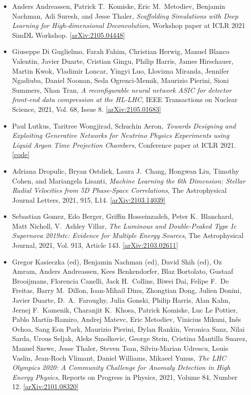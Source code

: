 \begin{itemize}
\item Anders Andreassen, Patrick T.\  Komiske, Eric M.\  Metodiev, Benjamin Nachman, Adi Suresh, and Jesse Thaler, \textit{Scaffolding Simulations with Deep Learning for High-dimensional Deconvolution}, Workshop paper at ICLR 2021 SimDL Workshop. \href{https://arxiv.org/abs/2105.04448}{[arXiv:2105.04448]} 
\item Giuseppe Di Guglielmo, Farah Fahim, Christian Herwig, Manuel Blanco Valentin, Javier Duarte, Cristian Gingu, Philip Harris, James Hirschauer, Martin Kwok, Vladimir Loncar, Yingyi Luo, Llovizna Miranda, Jennifer Ngadiuba, Daniel Noonan, Seda Ogrenci-Memik, Maurizio Pierini, Sioni Summers, Nhan Tran, \textit{A reconfigurable neural network ASIC for detector front-end data compression at the HL-LHC}, IEEE Transactions on Nuclear Science, 2021, Vol. 68, Issue 8. \href{https://arxiv.org/abs/2105.01683}{[arXiv:2105.01683]} 
\item Paul Lutkus, Taritree Wongjirad, Schuchin Aeron, \textit{Towards Designing and Exploiting Generative Networks for Neutrino Physics Experiments using Liquid Argon Time Projection Chambers}, Conference paper at ICLR 2021.  \href{https://github.com/NuTufts/LArTPC-VQVAE}{[code]} 
\item Adriana Dropulic, Bryan Ostdiek, Laura J.\  Chang, Hongwan Liu, Timothy Cohen, and Mariangela Lisanti, \textit{Machine Learning the 6th Dimension: Stellar Radial Velocities from 5D Phase-Space Correlations}, The Astrophysical Journal Letters, 2021, 915, L14. \href{https://arxiv.org/abs/2103.14039}{[arXiv:2103.14039]} 
\item Sebastian Gomez, Edo Berger, Griffin Hosseinzadeh, Peter K.\  Blanchard, Matt Nicholl, V.\  Ashley Villar, \textit{The Luminous and Double-Peaked Type Ic Supernova 2019stc: Evidence for Multiple Energy Sources}, The Astrophysical Journal, 2021, Vol. 913, Article 143. \href{https://arxiv.org/abs/2103.02611}{[arXiv:2103.02611]} 
\item Gregor Kasieczka (ed), Benjamin Nachman (ed), David Shih (ed), Oz Amram, Anders Andreassen, Kees Benkendorfer, Blaz Bortolato, Gustaaf Brooijmans, Florencia Canelli, Jack H.\  Collins, Biwei Dai, Felipe F.\  De Freitas, Barry M.\  Dillon, Ioan-Mihail Dinu, Zhongtian Dong, Julien Donini, Javier Duarte, D.\  A.\  Faroughy, Julia Gonski, Philip Harris, Alan Kahn, Jernej F.\  Kamenik, Charanjit K.\  Khosa, Patrick Komiske, Luc Le Pottier, Pablo Martín-Ramiro, Andrej Matevc, Eric Metodiev, Vinicius Mikuni, Inês Ochoa, Sang Eon Park, Maurizio Pierini, Dylan Rankin, Veronica Sanz, Nilai Sarda, Urous Seljak, Aleks Smolkovic, George Stein, Cristina Mantilla Suarez, Manuel Szewc, Jesse Thaler, Steven Tsan, Silviu-Marian Udrescu, Louis Vaslin, Jean-Roch Vlimant, Daniel Williams, Mikaeel Yunus, \textit{The LHC Olympics 2020: A Community Challenge for Anomaly Detection in High Energy Physics}, Reports on Progress in Physics, 2021, Volume 84, Number 12. \href{https://arxiv.org/abs/2101.08320}{[arXiv:2101.08320]} 

\end{itemize}
